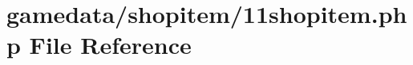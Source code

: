 \hypertarget{11shopitem_8php}{\section{gamedata/shopitem/11shopitem.php File Reference}
\label{11shopitem_8php}
}
